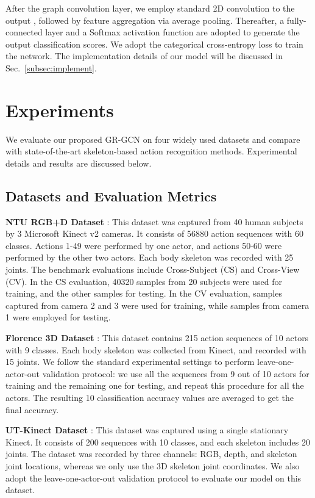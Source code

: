 \documentclass[conference]{IEEEtran}
\begin{document}
After the graph convolution layer, we employ standard 2D convolution to the output , followed by feature aggregation via average pooling. Thereafter, a fully-connected layer and a Softmax activation function are adopted to generate the output classification scores. We adopt the categorical cross-entropy loss to train the network. The implementation details of our model will be discussed in Sec.~\ref{subsec:implement}.

\section{Experiments}
\label{sec:results}

We evaluate our proposed GR-GCN on four widely used datasets and compare with state-of-the-art skeleton-based action recognition methods. Experimental details and results are discussed below.

\subsection{Datasets and Evaluation Metrics}

\textbf{NTU RGB+D Dataset} \cite{Shahroudy_2016_CVPR}: This dataset was captured from 40 human subjects by 3 Microsoft Kinect v2 cameras. It consists of 56880 action sequences with 60 classes. Actions 1-49 were performed by one actor, and actions 50-60 were performed by the other two actors. Each body skeleton was recorded with 25 joints. The benchmark evaluations include Cross-Subject (CS) and Cross-View (CV). In the CS evaluation, 40320 samples from 20 subjects were used for training, and the other samples for testing. In the CV evaluation, samples captured from camera 2 and 3 were used for training, while samples from camera 1 were employed for testing.

\textbf{Florence 3D Dataset} \cite{Lorenzo_CVPRW_2013}: This dataset contains 215 action sequences of 10 actors with 9 classes. Each body skeleton was collected from Kinect, and recorded with 15 joints. We follow the standard experimental settings to perform leave-one-actor-out validation protocol: we use all the sequences from 9 out of 10 actors for training and the remaining one for testing, and repeat this procedure for all the actors. The resulting 10 classification accuracy values are averaged to get the final accuracy.

\textbf{UT-Kinect Dataset} \cite{Xia12cvpr}: This dataset was captured using a single stationary Kinect. It consists of 200 sequences with 10 classes, and each skeleton includes 20 joints. The dataset was recorded by three channels: RGB, depth, and skeleton joint locations, whereas we only use the 3D skeleton joint coordinates. We also adopt the leave-one-actor-out validation protocol to evaluate our model on this dataset.
\end{document}
